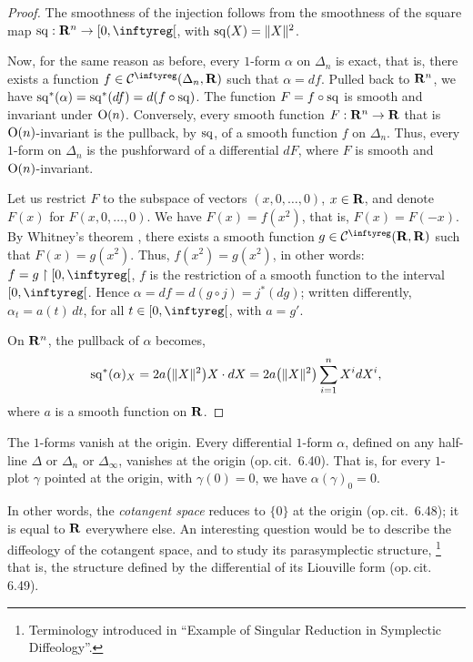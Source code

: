 \begin{proof}
  The smoothness of the injection follows from the smoothness of the square map $\Sq:\RR^n \to \LeftClosedInterval{0,\infty}$, with ${\operatorname{sq}}(X)=\Vert X \Vert^2$.
  
  Now,
  for the same reason as before, every $1$-form $\alpha$ on $\Delta_n$ is exact,
  that is,
  there exists a function $f\in \Cinfty(\Delta_n,\RR)$ such that $\alpha = df$.
  Pulled back to $\mathbf{R}^n$,
  we have ${\operatorname{sq}}^*(\alpha) = {\operatorname{sq}}^*(df) = d(f\circ {\operatorname{sq}})$.
  The function $F=f\circ{\operatorname{sq}}$ is smooth and invariant under $\mathrm{O}(n)$.
  Conversely, every smooth function $F : \mathbf{R}^n \to \mathbf{R}$ that is $\mathrm{O}(n)$-invariant is the pullback,
  by ${\operatorname{sq}}$,
  of a smooth function $f$ on $\Delta_n$.
  Thus, every $1$-form on $\Delta_n$ is the pushforward of a differential $dF$,
  where $F$ is smooth and $\mathrm{O}(n)$-invariant.
  
  Let us restrict $F$ to the subspace of vectors $(x,0,\ldots,0)$, $x\in \mathbf{R}$,
  and denote $F(x)$ for $F(x,0,\ldots,0)$.
  We have $F(x)= f(x^2)$,
  that is,
  $F(x) = F(-x)$.
  By Whitney's theorem \cite{Whi43},
  there exists a smooth function $g\in \Cinfty(\RR,\RR)$ such that $F(x)=g(x^2)$.
  Thus,
  $f(x^2)=g(x^2)$,
  in other words:
  $f=g\restriction \LeftClosedInterval{0,\infty}$,
  $f$ is the restriction of a smooth function to the interval $\LeftClosedInterval{0,\infty}$.
  Hence $\alpha = df = d(g\circ j)= j^*(dg)$;
  written differently,
  $\alpha_t = a(t)\, dt$, for all $t\in \LeftClosedInterval{0,\infty}$, with $a = g'$.
  
  On $\mathbf{R}^n$,
  the pullback of $\alpha$ becomes,
  $$
    {\operatorname{sq}}^*(\alpha)_X = 2 a\big(\Vert X \Vert^2\big) X \cdot dX = 2 a\big(\Vert X \Vert^2\big) \sum_{i=1}^n X^i dX^i,
    $$
  where $a$ is a smooth function on $\mathbf{R}$.
\end{proof}

\begin{Article}{The $1$-forms vanish at the origin.}{}
  Every differential $1$-form $\alpha$,
  defined on any half-line $\Delta$ or $\Delta_n$ or $\Delta_\infty$,
  vanishes at the origin (op.\,cit. \textsection\,6.40).
  That is,
  for every $1$-plot $\gamma$ pointed at the origin,
  with $\gamma(0)=0$,
  we have $\alpha(\gamma)_0 = 0$.
  
  In other words, the \textit{cotangent space} reduces to $\{0\}$ at the origin (op.\,cit. \textsection\,6.48);
  it is equal to $\mathbf{R}$ everywhere else.
  An interesting question would be to describe the diffeology of the cotangent space,
  and to study its parasymplectic structure,%
  \footnote{Terminology introduced in ``Example of Singular Reduction in Symplectic Diffeology''.}
  that is,
  the structure defined by the differential of its Liouville form (op.\,cit. \textsection\,6.49).
\end{Article}

